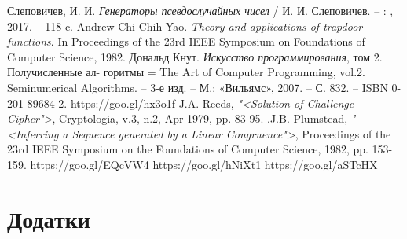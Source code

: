 \documentclass[oneside,final,14pt]{extreport}
\begin{document}
\begin{large}
\begin{thebibliography}{20}
Слеповичев, И. И. \emph{Генераторы псевдослучайных чисел} / И. И. Слеповичев. -- : , 2017. -- 118 c.
Andrew Chi-Chih Yao. \emph{Theory and applications of trapdoor functions}. In Proceedings of 
the 23rd IEEE Symposium on Foundations of Computer Science,
1982.
Дональд Кнут. \emph{Искусство программирования}, том 2. Получисленные ал-
горитмы = The Art of Computer Programming, vol.2. Seminumerical Algorithms. -- 3-е изд. 
-- М.: «Вильямс», 2007. -- С. 832. -- ISBN 0-201-89684-2.
https://goo.gl/hx3o1f
J.A. Reeds, \emph{"<Solution of Challenge Cipher">}, Cryptologia, v.3, n.2, Apr 1979,
pp. 83-95.
.J.B. Plumstead, \emph{"<Inferring a Sequence generated by a Linear Congruence">},
Proceedings of the 23rd IEEE Symposium on the Foundations of Computer
Science, 1982, pp. 153-159.
https://goo.gl/EQcVW4
https://goo.gl/hNiXt1
https://goo.gl/aSTcHX
\end{thebibliography}

\chapter*{Додатки}\label{c:9}

\end{large}
\end{document}

